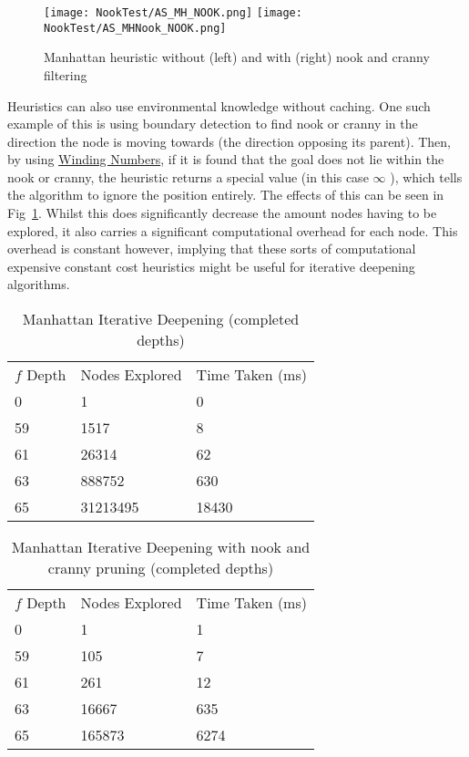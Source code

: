 \documentclass[conference]{IEEEtran}
\begin{document}
\begin{figure}[H]
    \centering
     \texttt{[image: NookTest/AS\_MH\_NOOK.png]}
     \texttt{[image: NookTest/AS\_MHNook\_NOOK.png]}
    \caption{Manhattan heuristic without (left) and with (right) nook and cranny filtering}    
    \label{fig:SmartNook}
\end{figure}

\par Heuristics can also use environmental knowledge without caching. One such example of this is using boundary detection to find nook or cranny in the direction the node is moving towards (the direction opposing its parent). Then, by using \href{https://en.wikipedia.org/wiki/Winding_number}{Winding Numbers}, if it is found that the goal does not lie within the nook or cranny, the heuristic returns a special value (in this case $\infty$ ), which tells the algorithm to ignore the position entirely. The effects of this can be seen in Fig~\ref{fig:SmartNook}. Whilst this does significantly decrease the amount nodes having to be explored, it also carries a significant computational overhead for each node. This overhead is constant however, implying that these sorts of computational expensive constant cost heuristics might be useful for iterative deepening algorithms.

\begin{table}[H]
\begin{tabular}{lll}
$f$ Depth           &  Nodes Explored   & Time Taken (ms) \\
0                 & 1                 & 0             \\
59                 & 1517                 & 8             \\
61                 & 26314                 & 62             \\
63                 & 888752                & 630             \\
65                  & 31213495              & 18430
\end{tabular}
\caption{Manhattan Iterative Deepening (completed depths)}
\label{tab:NookMH}
\end{table}

\begin{table}[H]
\begin{tabular}{lll}
$f$ Depth           &  Nodes Explored   & Time Taken (ms) \\
0                 & 1                 & 1             \\
59                 & 105                 & 7             \\
61                 & 261                 & 12             \\
63                 & 16667                & 635             \\
65                  & 165873              & 6274
\end{tabular}
\caption{Manhattan Iterative Deepening with nook and cranny pruning (completed depths)}
\label{tab:NookMHNook}
\end{table}
\end{document}

